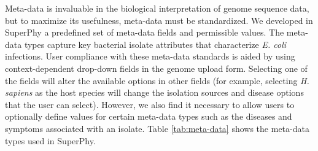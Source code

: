 \documentclass[a4paper,twoside]{article}
\begin{document}
Meta-data is invaluable in the biological interpretation of genome sequence data, but to maximize its usefulness, meta-data must be standardized. We developed in SuperPhy a predefined set of meta-data fields and permissible values. The meta-data types capture key bacterial isolate attributes that characterize \textit{E. coli} infections. User compliance with these meta-data standards is aided by using context-dependent drop-down fields in the genome upload form. Selecting one of the fields will alter the available options in other fields (for example, selecting \textit{H. sapiens} as the host species will change the isolation sources and disease options that the user can select).  However, we also find it necessary to allow users to optionally define values for certain meta-data types such as the diseases and symptoms associated with an isolate. Table \ref{tab:meta-data} shows the meta-data types used in SuperPhy.
\end{document}

